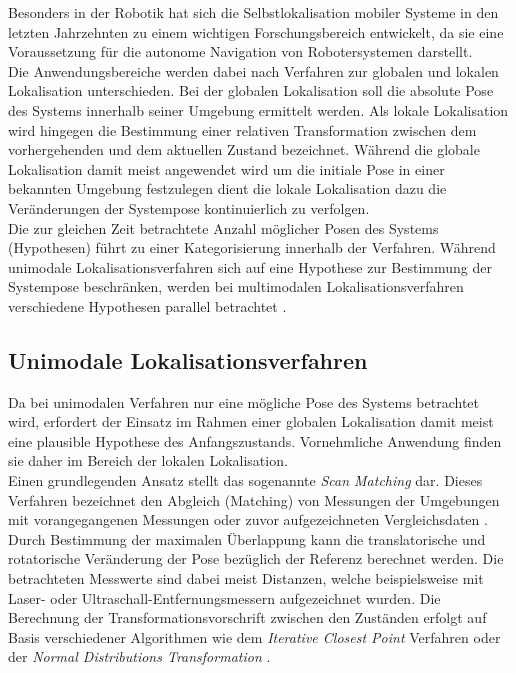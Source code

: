 Besonders in der Robotik hat sich die Selbstlokalisation mobiler Systeme in den letzten Jahrzehnten zu einem wichtigen Forschungsbereich entwickelt, da sie eine Voraussetzung für die autonome Navigation von Robotersystemen darstellt.\\
Die Anwendungsbereiche werden dabei nach Verfahren zur globalen und lokalen Lokalisation unterschieden. Bei der globalen Lokalisation soll die absolute Pose des Systems innerhalb seiner Umgebung ermittelt werden. Als lokale Lokalisation wird hingegen die Bestimmung einer relativen Transformation zwischen dem vorhergehenden und dem aktuellen Zustand bezeichnet. Während die globale Lokalisation damit meist angewendet wird um die initiale Pose in einer bekannten Umgebung festzulegen dient die lokale Lokalisation dazu die Veränderungen der Systempose kontinuierlich zu verfolgen.\\
Die zur gleichen Zeit betrachtete Anzahl möglicher Posen des Systems (Hypothesen) führt zu einer Kategorisierung innerhalb der Verfahren. Während unimodale Lokalisationsverfahren sich auf eine Hypothese zur Bestimmung der Systempose beschränken, werden bei multimodalen Lokalisationsverfahren verschiedene Hypothesen parallel betrachtet .
\subsection{Unimodale Lokalisationsverfahren}
\label{chap.unimod}
Da bei unimodalen Verfahren nur eine mögliche Pose des Systems betrachtet wird, erfordert der Einsatz im Rahmen einer globalen Lokalisation damit meist eine  plausible Hypothese des Anfangszustands. Vornehmliche Anwendung finden sie daher im Bereich der lokalen Lokalisation.\\

Einen grundlegenden Ansatz stellt das sogenannte \textit{Scan Matching} dar. Dieses Verfahren bezeichnet den Abgleich (Matching) von Messungen der Umgebungen mit vorangegangenen Messungen \cite{Gutmann1996} oder zuvor aufgezeichneten Vergleichsdaten \cite{Gutmann1998}. Durch Bestimmung der maximalen Überlappung kann die translatorische und rotatorische Veränderung der Pose bezüglich der Referenz berechnet werden. Die betrachteten Messwerte sind dabei meist Distanzen, welche beispielsweise mit Laser- \cite{Diosi2007} oder Ultraschall-Entfernungsmessern \cite{Burguera2005} aufgezeichnet wurden. Die Berechnung der Transformationsvorschrift zwischen den Zuständen erfolgt auf Basis verschiedener Algorithmen wie dem \textit{Iterative Closest Point} Verfahren \cite{Besl1992}\cite{Lu1994} oder der \textit{Normal Distributions Transformation} \cite{Biber2003}.\\

